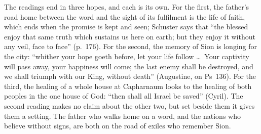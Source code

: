 The readings end in three hopes, and each is its own. For the first, the
father's road home between the word and the sight of its fulfilment is the
life of faith, which ends when the promise is kept and seen; Schuster says that
``the blessed enjoy that same truth which sustains us here on earth; but they
enjoy it without any veil, face to face'' (p.~176). For the second, the memory
of Sion is longing for the city: ``whither your hope goeth before, let your
life follow \dots\ Your captivity will pass away, your happiness will come; the
last enemy shall be destroyed, and we shall triumph with our King, without
death'' (Augustine, on Ps~136). For the third, the healing of a whole house at
Capharnaum looks to the healing of both peoples in the one house of God:
``then shall all Israel be saved'' (Cyril). The second reading makes no claim
about the other two, but set beside them it gives them a setting. The father
who walks home on a word, and the nations who believe without signs, are both
on the road of exiles who remember Sion.
